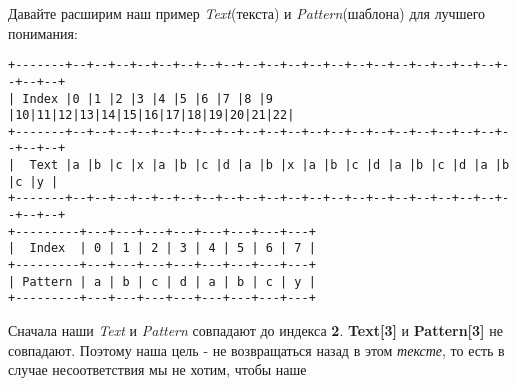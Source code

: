 Давайте расширим наш пример \textit{Text}(текста) и \textit{Pattern}(шаблона) для лучшего понимания:
\vspace{\baselineskip}
\begin{tcolorbox}
\begin{verbatim}
+-------+--+--+--+--+--+--+--+--+--+--+--+--+--+--+--+--+--+--+--+--+--+--+--+
| Index |0 |1 |2 |3 |4 |5 |6 |7 |8 |9 |10|11|12|13|14|15|16|17|18|19|20|21|22|
+-------+--+--+--+--+--+--+--+--+--+--+--+--+--+--+--+--+--+--+--+--+--+--+--+
|  Text |a |b |c |x |a |b |c |d |a |b |x |a |b |c |d |a |b |c |d |a |b |c |y |
+-------+--+--+--+--+--+--+--+--+--+--+--+--+--+--+--+--+--+--+--+--+--+--+--+
+---------+---+---+---+---+---+---+---+---+
|  Index  | 0 | 1 | 2 | 3 | 4 | 5 | 6 | 7 |
+---------+---+---+---+---+---+---+---+---+
| Pattern | a | b | c | d | a | b | c | y |
+---------+---+---+---+---+---+---+---+---+
\end{verbatim}
\end{tcolorbox}
\vspace{\baselineskip}
Сначала наши \textit{Text} и \textit{Pattern} совпадают до индекса \textbf{2}. \textbf{Text[3]} и \textbf{Pattern[3]} не совпадают. Поэтому наша
цель - не возвращаться назад в этом \textit{тексте}, то есть в случае несоответствия мы не хотим, чтобы наше

